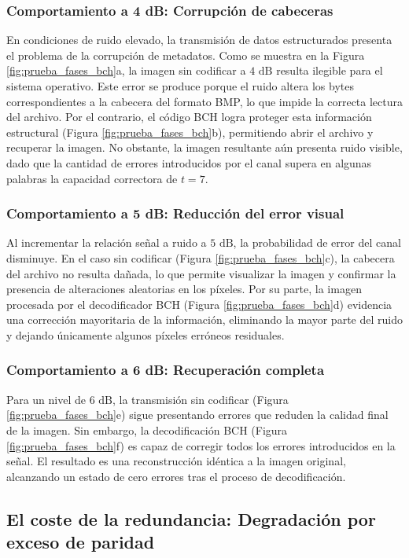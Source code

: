 \subsubsection{Comportamiento a 4 dB: Corrupción de cabeceras}
En condiciones de ruido elevado, la transmisión de datos estructurados presenta el problema de la corrupción de metadatos. Como se muestra en la Figura \ref{fig:prueba_fases_bch}a, la imagen sin codificar a $4\text{ dB}$ resulta ilegible para el sistema operativo. Este error se produce porque el ruido altera los bytes correspondientes a la cabecera del formato BMP, lo que impide la correcta lectura del archivo. Por el contrario, el código BCH logra proteger esta información estructural (Figura \ref{fig:prueba_fases_bch}b), permitiendo abrir el archivo y recuperar la imagen. No obstante, la imagen resultante aún presenta ruido visible, dado que la cantidad de errores introducidos por el canal supera en algunas palabras la capacidad correctora de $t=7$.

\subsubsection{Comportamiento a 5 dB: Reducción del error visual}
Al incrementar la relación señal a ruido a $5\text{ dB}$, la probabilidad de error del canal disminuye. En el caso sin codificar (Figura \ref{fig:prueba_fases_bch}c), la cabecera del archivo no resulta dañada, lo que permite visualizar la imagen y confirmar la presencia de alteraciones aleatorias en los píxeles. Por su parte, la imagen procesada por el decodificador BCH (Figura \ref{fig:prueba_fases_bch}d) evidencia una corrección mayoritaria de la información, eliminando la mayor parte del ruido y dejando únicamente algunos píxeles erróneos residuales.

\subsubsection{Comportamiento a 6 dB: Recuperación completa}
Para un nivel de $6\text{ dB}$, la transmisión sin codificar (Figura \ref{fig:prueba_fases_bch}e) sigue presentando errores que reduden la calidad final de la imagen. Sin embargo, la decodificación BCH (Figura \ref{fig:prueba_fases_bch}f) es capaz de corregir todos los errores introducidos en la señal. El resultado es una reconstrucción idéntica a la imagen original, alcanzando un estado de cero errores tras el proceso de decodificación.

\subsection{El coste de la redundancia: Degradación por exceso de paridad}

